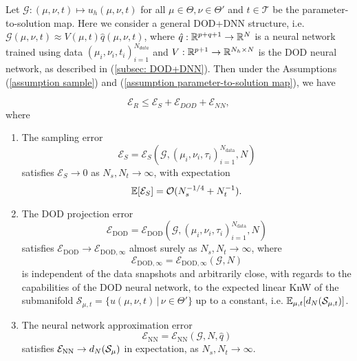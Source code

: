 \begin{theorem} \label{theo: relative error DOD+DNN}
    Let $\mathcal{G}:(\mu, \nu, t) \mapsto u_h(\mu, \nu, t)$ for all $\mu \in \Theta, \nu \in \Theta'$ and $t \in \mathcal{T}$ be the parameter-to-solution map. Here we consider a general DOD+DNN structure, i.e. $\mathcal{G}(\mu, \nu, t) \approx V(\mu, t) \hat{q}(\mu, \nu, t)$, where $\hat{q}: \mathbb{R}^{p+q+1} \to \mathbb{R}^N$ is a neural network trained using data $(\mu_i, \nu_i, t_i)_{i=1}^{N_{data}}$ and $V: \mathbb{R}^{p+1} \to \mathbb{R}^{N_h \times N}$ is the DOD neural network, as described in (\ref{subsec: DOD+DNN}). Then under the Assumptions (\ref{assumption sample}) and (\ref{assumption parameter-to-solution map}), we have
    
    \begin{equation}
        \mathcal{E}_R \leq \mathcal{E}_S + \mathcal{E}_{DOD} + \mathcal{E}_{NN},
    \end{equation}
    where 
    
    \begin{enumerate}
        \item The sampling error 
        \[
            \mathcal{E}_S = \mathcal{E}_S\left(\mathcal{G}, (\mu_i, \nu_i, \tau_i)_{i = 1}^{N_{\text{data}}}, N\right)
        \]
        satisfies $\mathcal{E}_S \to 0$ as $N_s, N_t \to \infty$, with expectation 
        \[
            \mathbb{E}[\mathcal{E}_S] = \mathcal{O}(N_s^{-1/4} + N_t^{-1}).
        \]
    
        \item The DOD projection error 
        \[
            \mathcal{E}_{\text{DOD}} = \mathcal{E}_{\text{DOD}}\left(\mathcal{G}, (\mu_i, \nu_i, \tau_i)_{i = 1}^{N_{\text{data}}}, N\right)
        \]
        satisfies $\mathcal{E}_{\text{DOD}} \to \mathcal{E}_{\text{DOD}, \infty}$ almost surely as $N_s, N_t \to \infty$, where
        \[
            \mathcal{E}_{\text{DOD}, \infty} = \mathcal{E}_{\text{DOD}, \infty}(\mathcal{G}, N)
        \]
        is independent of the data snapshots and arbitrarily close, with regards to the capabilities of the DOD neural network, 
        to the expected linear KnW of the submanifold $\mathcal{S}_{\mu, t} = \{ u(\mu, \nu, t) \, \vert \, \nu \in \Theta' \}$ up to a constant, 
        i.e. $\mathbb{E}_{\mu, t}[d_N(\mathcal{S}_{\mu, t})]$.
    
        \item The neural network approximation error
        \[
            \mathcal{E}_{\text{NN}} = \mathcal{E}_{\text{NN}}\left(\mathcal{G}, N, \hat{q}\right)
        \]
        satisfies $\mathcal{E}_{\text{NN}} \to d_N(\mathcal{S}_{\mu})$ in expectation, as $N_s, N_t \to \infty$.
    \end{enumerate}

\end{theorem}
